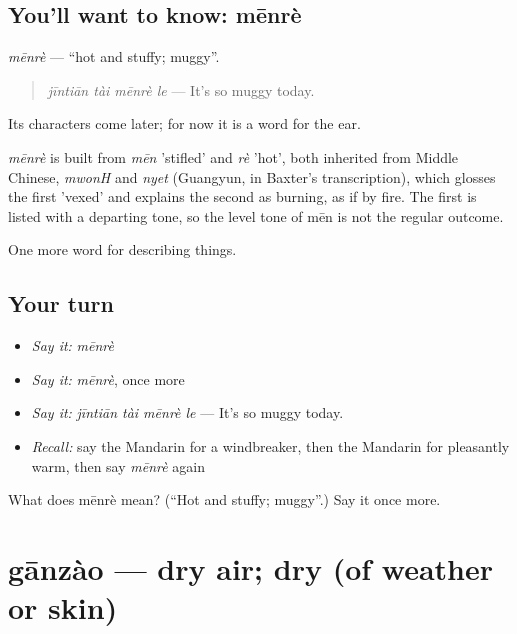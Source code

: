 \subsection*{You'll want to know: mēnrè}
\emph{mēnrè} — \textquotedblleft{}hot and stuffy; muggy\textquotedblright{}.

\begin{quote}
\emph{jīntiān tài mēnrè le} — It's so muggy today.
\end{quote}

Its characters come later; for now it is a word for the ear.

\begin{cousinweb}
\emph{mēnrè} is built from \emph{mēn} 'stifled' and \emph{rè} 'hot', both inherited from Middle Chinese, \emph{mwonH} and \emph{nyet} (Guangyun, in Baxter's transcription), which glosses the first 'vexed' and explains the second as burning, as if by fire. The first is listed with a departing tone, so the level tone of mēn is not the regular outcome.
\end{cousinweb}

\begin{grammarlens}[title={What you've built}]
One more word for describing things.
\end{grammarlens}

\subsection*{Your turn}
\begin{itemize}
\raggedright
  \item \emph{Say it:} \emph{mēnrè}
  \item \emph{Say it:} \emph{mēnrè}, once more
  \item \emph{Say it:} \emph{jīntiān tài mēnrè le} — It's so muggy today.
  \item \emph{Recall:} say the Mandarin for a windbreaker, then the Mandarin for pleasantly warm, then say \emph{mēnrè} again
\end{itemize}

\begin{tcolorbox}[breakable,colback=teal!4,colframe=teal!35!black,title={Before you move on}]
What does mēnrè mean? (\textquotedblleft{}Hot and stuffy; muggy\textquotedblright{}.) Say it once more.
\end{tcolorbox}
\section[gānzào]{gānzào — dry air; dry (of weather or skin)}

